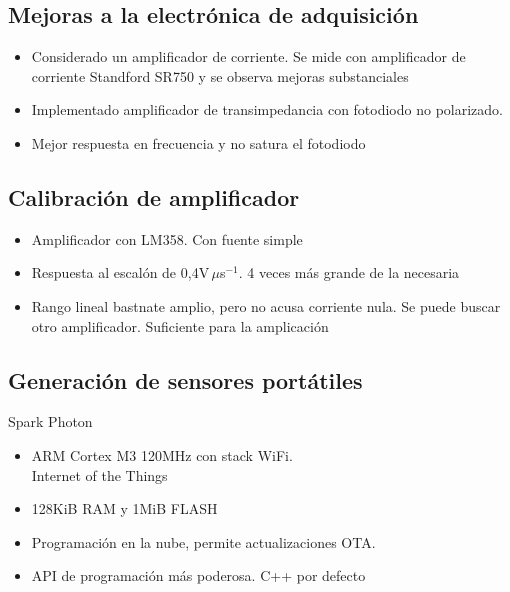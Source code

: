 \documentclass{article}
\begin{document}
    \subsection{Mejoras a la electrónica de adquisición}

        \begin{itemize}
        \item Considerado un amplificador de corriente. Se mide con amplificador de corriente Standford SR750 y se observa mejoras substanciales
        \item Implementado amplificador de transimpedancia con fotodiodo no polarizado. 
        \item Mejor respuesta en frecuencia y no satura el fotodiodo
        \end{itemize}

 



\subsection{Calibración de amplificador}

        \begin{itemize}
        \item Amplificador con LM358. Con fuente simple
        \item Respuesta al escalón de 0,4V$\,\mu$s$^{-1}$. 4 veces más grande de la necesaria
        \item Rango lineal bastnate amplio, pero no acusa corriente nula. Se puede buscar otro amplificador. Suficiente para la amplicación
        \end{itemize}



    \subsection{Generación de sensores portátiles}

        Spark Photon
        \begin{itemize}
        \item ARM Cortex M3 120MHz con stack WiFi. \\Internet of the Things
        \item 128KiB RAM y 1MiB FLASH
        \item Programación en la nube, permite actualizaciones OTA.
        \item API de programación más poderosa. C++ por defecto
        \end{itemize}
  
\end{document}
